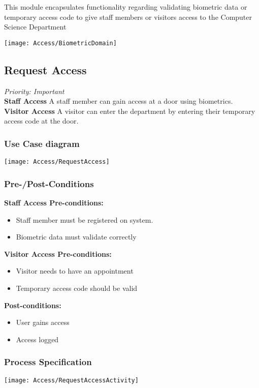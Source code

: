 
This module encapsulates functionality regarding validating biometric data or temporary access code to give staff members or visitors access to the Computer Science Department

\texttt{[image: Access/BiometricDomain]}

\subsection{Request Access}
\textit{Priority: Important} \\


\textbf{Staff Access} A staff member can gain access at a door using biometrics. \\
\textbf{Visitor Access} A visitor can enter the department by entering their temporary access code at the door.

\subsubsection{Use Case diagram}
\texttt{[image: Access/RequestAccess]}

\subsubsection{Pre-/Post-Conditions}
\textbf{Staff Access Pre-conditions:} 
	\begin{itemize}
		\item Staff member must be registered on system.
		\item Biometric data must validate correctly
	\end{itemize}
\textbf{Visitor Access Pre-conditions:} 
	\begin{itemize}
		\item Visitor needs to have an appointment
		\item Temporary access code should be valid
	\end{itemize}
\textbf{ Post-conditions:} 
	\begin{itemize}
		\item User gains access
		\item Access logged
	\end{itemize}
	
\subsubsection{Process Specification}
	\texttt{[image: Access/RequestAccessActivity]}	

